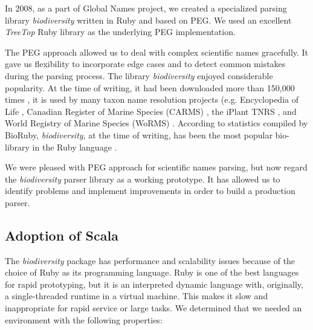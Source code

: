 \documentclass{bmcart}
\begin{document}
In 2008, as a part of Global Names project, we created a specialized parsing
library \textit{biodiversity} \cite{biodiversity} written in Ruby and based on
PEG\@.  We used an excellent \textit{TreeTop} Ruby library \cite{treetop} as
the underlying PEG implementation.

The PEG approach allowed us to deal with complex scientific names gracefully.
It gave us flexibility to incorporate edge cases and to detect common mistakes
during the parsing process. The library \textit{biodiversity} enjoyed
considerable popularity. At the time of writing, it had been downloaded more
than 150,000 times \cite{bdiv-downloads}, it is used by many taxon name
resolution projects (e.g. Encyclopedia of Life \cite{eol}, Canadian Register of
Marine Species (CARMS) \cite{carms}, the iPlant TNRS \cite{iplant}, and World
Registry of Marine Species (WoRMS) \cite{worms}.  According to statistics
compiled by BioRuby, \textit{biodiversity}, at the time of writing, has been
the most popular bio-library in the Ruby language \cite{biogems}.

We were pleased with PEG approach for scientific names parsing, but now regard
the \textit{biodiversity} parser library as a working prototype. It has allowed
us to identify problems and implement improvements in order to build a
production parser.

\subsection*{Adoption of Scala}

The \textit{biodiversity} package has performance and scalability issues
because of the choice of Ruby as its programming language. Ruby is one of the
best languages for rapid prototyping, but it is an interpreted dynamic language
with, originally, a single-threaded runtime in a virtual machine. This makes it
slow and inappropriate for rapid service or large tasks. We determined that we
needed an environment with the following properties:
\end{document}
